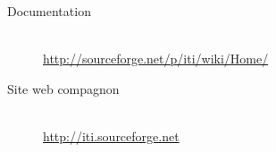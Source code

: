 			\begin{description}
				\item [Documentation]                       \hfill \\
					\url{http://sourceforge.net/p/iti/wiki/Home/}
				\item [Site web compagnon]    \hfill \\
					\url{http://iti.sourceforge.net}
			\end{description}

			